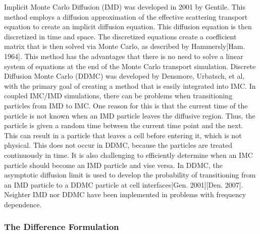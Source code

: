 	Implicit Monte Carlo Diffusion (IMD) was developed in 2001 by Gentile. This method employs a diffusion approximation of the effective scattering transport equation to create an implicit diffusion equation. This diffusion equation is then discretized in time and space. The discretized equations create a coefficient matrix that is then solved via Monte Carlo, as described by Hammersly[Ham. 1964]. This method has the advantages that there is no need to solve a linear system of equations at the end of the Monte Carlo transport simulation. Discrete Diffusion Monte Carlo (DDMC) was developed by Densmore, Urbatsch, et al, with the primary goal of creating a method that is easily integrated into IMC. In coupled IMC/IMD simulations, there can be problems when transitioning particles from IMD to IMC. One reason for this is that the current time of the particle is not known when an IMD particle leaves the diffusive region. Thus, the particle is given a random time between the current time point and the next. This can result in a particle that leaves a cell before entering it, which is not physical. This does not occur in DDMC, because the particles are treated continuously in time. It is also challenging to efficiently determine when an IMC particle should become an IMD particle and vise versa. In DDMC, the asymptotic diffusion limit is used to develop the probability of transitioning from an IMD particle to a DDMC particle at cell interfaces[Gen. 2001][Den. 2007]. Neighter IMD nor DDMC have been implemented in problems with frequency dependence.

\belowSubSecSkip

\subsubsection{The Difference Formulation}
\label{sec:Intro-DIMC}
	
